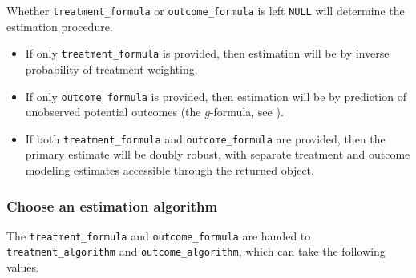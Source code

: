 \documentclass[
]{article}
\providecommand{\tightlist}{%
  \setlength{\itemsep}{0pt}\setlength{\parskip}{0pt}}
\begin{document}
Whether \texttt{treatment\_formula} or \texttt{outcome\_formula} is left \texttt{NULL} will determine the estimation procedure.

\begin{itemize}
\tightlist
\item
  If only \texttt{treatment\_formula} is provided, then estimation will be by inverse probability of treatment weighting.
\item
  If only \texttt{outcome\_formula} is provided, then estimation will be by prediction of unobserved potential outcomes (the \(g\)-formula, see \citet{hernan2021}).
\item
  If both \texttt{treatment\_formula} and \texttt{outcome\_formula} are provided, then the primary estimate will be doubly robust, with separate treatment and outcome modeling estimates accessible through the returned object.
\end{itemize}

\subsubsection{Choose an estimation algorithm}\label{choose-an-estimation-algorithm}

The \texttt{treatment\_formula} and \texttt{outcome\_formula} are handed to \texttt{treatment\_algorithm} and \texttt{outcome\_algorithm}, which can take the following values.
\end{document}
